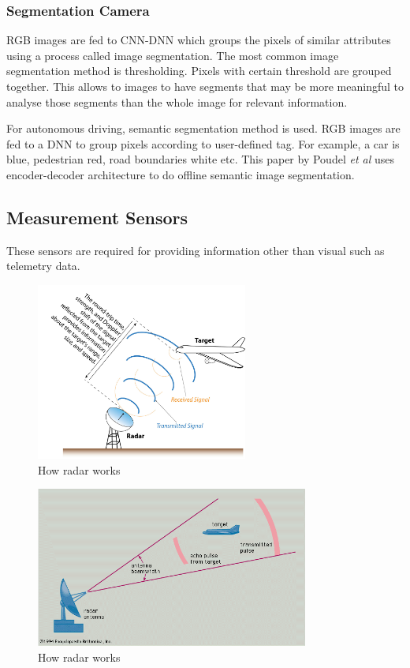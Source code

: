 \subsubsection*{Segmentation Camera}
RGB images are fed to CNN-DNN which groups the pixels of similar attributes using a
process called image segmentation. The most common image segmentation method is
thresholding. Pixels with certain threshold are grouped together. This allows to images to
have segments that may be more meaningful to analyse those segments than the whole image
for relevant information.

For autonomous driving, semantic segmentation method is used. RGB images are fed to a DNN
to group pixels according to user-defined tag. For example, a car is blue, pedestrian red, road boundaries white etc.
This paper by Poudel \textit{et al} \cite{segmentationpaper} uses encoder-decoder
architecture to do offline semantic image segmentation.
\subsection{Measurement Sensors}
These sensors are required for providing information other than visual such as telemetry
data.
\begin{figure}[h]
	\centering
    \includegraphics[width=0.62\textwidth, scale=0.1]{figures/inkscape/RadarFig.jpg}
    \caption{How radar works}
    \label{fig:radarsensor}
\end{figure}

\begin{figure}[h]
	\centering
    \includegraphics[width=0.8\textwidth,
    scale=0.1]{figures/inkscape/target-radar-operation-Principle-pulse-portion-unit.png}
    \caption{How radar works}
    \label{fig:radarsensor1}
\end{figure}
